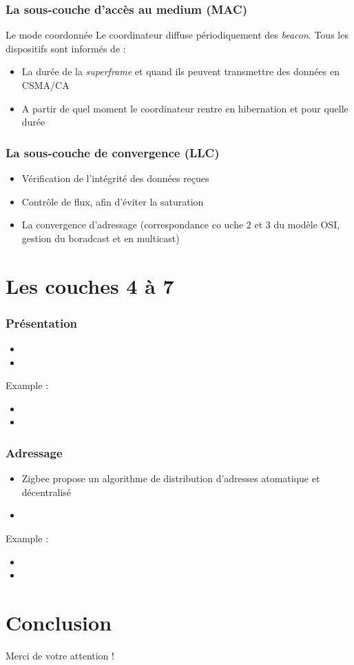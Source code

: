 \documentclass{beamer}
\begin{document}
  \begin{frame}
    \frametitle{La sous-couche d'accès au medium (MAC)}
    \begin{block}{Le mode coordonnée}
      Le coordinateur diffuse périodiquement des \textit{beacon}. Tous les dispositifs sont informés de :
      \begin{itemize}
        \item La durée de la \textit{superframe} et quand ils peuvent transmettre des données en CSMA/CA
        \item A partir de quel moment le coordinateur rentre en hibernation et pour quelle durée
      \end{itemize}
    \end{block}
  \end{frame}

  \begin{frame}
    \frametitle{La sous-couche de convergence (LLC)}
    \begin{itemize}
      \item Vérification de l'intégrité des données reçues
      \item Contrôle de flux, afin d'éviter la saturation
      \item La convergence d'adressage (correspondance co uche 2 et 3 du modèle OSI, gestion du boradcast et en multicast)
    \end{itemize}
  \end{frame}

  \section{Les couches 4 à 7}
  \begin{frame}
    \frametitle{Présentation}
    \begin{itemize}
      \item 
      \item 
    \end{itemize}
    Example : 
    \begin{itemize}
      \item 
      \item 
    \end{itemize}
  \end{frame}

  \begin{frame}
    \frametitle{Adressage}
    \begin{itemize}
      \item Zigbee propose un algorithme de distribution d'adresses atomatique et décentralisé
      \item 
    \end{itemize}
    Example : 
    \begin{itemize}
      \item 
      \item 
    \end{itemize}
  \end{frame}

  \section{Conclusion}
  \begin{frame}
    \begin{center}
      Merci de votre attention !
    \end{center}
  \end{frame}
\end{document}
